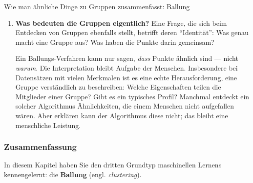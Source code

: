 \begin{lpu}{Wie man ähnliche Dinge zu Gruppen zusammenfasst: Ballung}
\begin{enumerate}
Für $\varepsilon$ gibt es keinen universell richtigen Wert, aber er sollte sich an der Grösse des Datenraumes orientieren. Programmier-Bibliotheken wie \texttt{scikit-learn}, welches Sie später benutzen werden, verwendet $\varepsilon = 10^{-4}$ für normalisierte Daten, bei welchen die Dimensionen zwischen $[0,1]$ liegen. Für unsere Koordinaten sollte der Wert entsprechend höher liegen. Ein anderer Ansatz ist es, eine maximale Anzahl Durchläufe vorgeben (z. B. 100 Wiederholungen).

\item \textbf{Was bedeuten die Gruppen eigentlich?} Eine Frage, die sich beim Entdecken von Gruppen ebenfalls stellt, betrifft deren ``Identität'':  Was genau macht eine Gruppe aus? Was haben die Punkte darin gemeinsam?  

Ein Ballungs-Verfahren kann nur sagen, \emph{dass} Punkte ähnlich sind — nicht \emph{warum}.  
Die Interpretation bleibt Aufgabe der Menschen. Insbesondere bei Datensätzen mit vielen Merkmalen ist es eine echte Herausforderung, eine Gruppe verständlich zu beschreiben:  Welche Eigenschaften teilen die Mitglieder einer Gruppe? Gibt es ein typisches Profil? Manchmal entdeckt ein solcher Algorithmus Ähnlichkeiten, die einem Menschen nicht aufgefallen wären. Aber erklären kann der Algorithmus diese nicht; das bleibt eine menschliche Leistung.
\end{enumerate}

\subsubsection*{Zusammenfassung}

In diesem Kapitel haben Sie den dritten Grundtyp maschinellen Lernens kennengelernt: die \textbf{Ballung} (engl. \textit{clustering}).  


\end{lpu}
